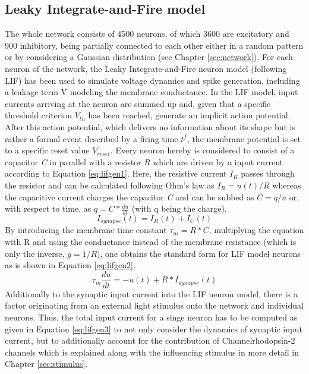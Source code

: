 \documentclass[14pt]{SelfArx} %
\numberwithin{equation}{section}
\begin{document}
\subsection{Leaky Integrate-and-Fire model}
The whole network consists of 4500 neurons, of which 3600 are excitatory and 900 inhibitory, being partially connected to each other either in a random pattern or by considering a Gaussian distribution (see Chapter \ref{sec:network}).\newline
For each neuron of the network, the Leaky Integrate-and-Fire neuron model (following LIF) has been used to simulate voltage dynamics and spike generation, including a leakage term V modeling the membrane conductance. \newline 
\newline
In the LIF model, input currents arriving at the neuron are summed up and, given that a specific threshold criterion $V_{th}$ has been reached, generate an implicit action potential. After this action potential, which delivers no information about its shape but is rather a formal event described by a firing time $t^{f}$, the membrane potential is set to a specific reset value $V_{reset}$. \newline
Every neuron hereby is considered to consist of a capacitor \textit{C} in parallel with a resistor \textit{R} which are driven by a input current according to Equation \ref{eq:lifgen1}. Here, the resistive current $I_{R}$ passes through the resistor and can be calculated following Ohm's law as $I_{R} = u(t)/R$ whereas the capacitive current charges the capacitor \textit{C} and can be subbed as $C = q/u$ or, with respect to time, as $q = C * \frac{du}{dt}$ (with q being the charge).
\begin{equation}
\label{eq:lifgen1}
I_{synapse}(t) = I_{R}(t) + I_{C}(t)
\end{equation}
By introducing the membrane time constant $\tau_{m} = R*C$, multiplying the equation with R and using the conductance instead of the membrane resistance (which is only the inverse, $g = 1/R$), one obtains the standard form for LIF model neurons as is shown in Equation \ref{eq:lifgen2}. \newline
\begin{equation}
\label{eq:lifgen2}
\tau_{m} \frac{du}{dt} = -u(t) + R* I_{synapse}(t)
\end{equation}
\newline
Additionally to the synaptic input current into the LIF neuron model, there is a factor originating from an external light stimulus onto the network and individual neurons. Thus, the total input current for a singe neuron has to be computed as given in Equation \ref{eq:lifgen3} to not only consider the dynamics of synaptic input current, but to additionally account for the contribution of Channelrhodopsin-2 channels which is explained along with the influencing stimulus in more detail in Chapter \ref{sec:stimulus}. \newline
\end{document}
